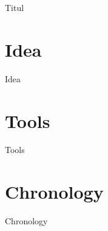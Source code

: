 \documentclass[a4paper,12pt]{book} %
\begin{document}
    {Titul}

    \tableofcontents

    \newpage

    \chapter{Idea}
    {Idea}

    \chapter{Tools}
    {Tools}

    \chapter{Chronology}
    {Chronology}
\end{document}
